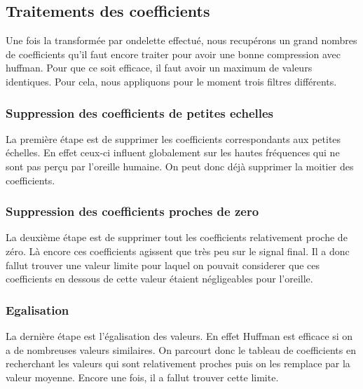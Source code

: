 \documentclass[a4paper,12pt]{article}
\begin{document}
\subsection{Traitements des coefficients}
Une fois la transform\'ee par ondelette effectu\'e, nous recup\'erons un
grand nombres de coefficients qu'il faut encore traiter pour avoir une
bonne compression avec huffman. Pour que ce soit efficace, il faut
avoir un maximum de valeurs identiques. Pour cela, nous appliquons
pour le moment trois filtres diff\'erents.
\subsubsection{Suppression des coefficients de petites echelles}
La premi\`ere \'etape est de supprimer les coefficients correspondants aux
petites \'echelles. En effet ceux-ci influent globalement sur les hautes
fr\'equences qui ne sont pas perçu par l'oreille humaine. On peut donc
d\'ejà supprimer la moitier des coefficients.
\subsubsection{Suppression des coefficients proches de zero}
La deuxi\`eme \'etape est de supprimer tout les coefficients relativement
proche de z\'ero. Là encore ces coefficients agissent que tr\`es peu sur
le signal final. Il a donc fallut trouver une valeur limite pour
laquel on pouvait considerer que ces coefficients en dessous de cette
valeur \'etaient n\'egligeables pour l'oreille.
\subsubsection{Egalisation}
La derni\`ere \'etape est l'\'egalisation des valeurs. En effet Huffman est
efficace si on a de nombreuses valeurs similaires. On parcourt donc le
tableau de coefficients en recherchant les valeurs qui sont
relativement proches puis on les remplace par la valeur
moyenne. Encore une fois, il a fallut trouver cette limite.
\end{document}
